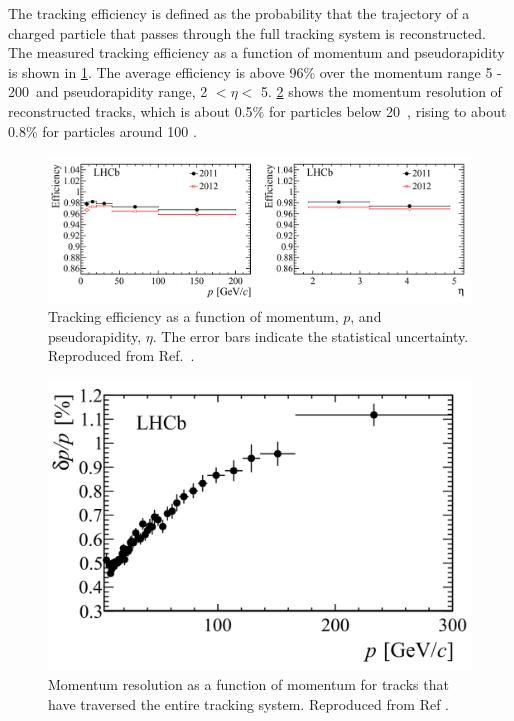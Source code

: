 The tracking efficiency is defined as the probability that the trajectory of a charged particle that passes through the full tracking system is reconstructed. The measured tracking efficiency as a function of momentum and pseudorapidity is shown in \fig\ref{trackingeff}. The average efficiency is above 96\% over the momentum range 5 - 200~\gevc and pseudorapidity range, 2 $< \eta <$ 5. \Fig\ref{momentumres} shows the momentum resolution of reconstructed tracks, which is about 0.5\% for particles below 20~\gevc, rising to about 0.8\% for particles around 100 \gevc. 

\begin{figure}
\includegraphics[width=\linewidth]{figures/detector/trackingefficiency.pdf}
\caption{Tracking efficiency as a function of momentum, $p$, and pseudorapidity, $\eta$. The error bars indicate the statistical uncertainty. Reproduced from Ref.~\cite{LHCb-DP-2013-002}.}
\label{trackingeff}
\end{figure}

\begin{figure}
\centering
\includegraphics[width=0.5\linewidth]{figures/detector/momentumresolution.pdf}
\caption{Momentum resolution as a function of momentum for tracks that have traversed the entire tracking system. Reproduced from Ref \cite{LHCb-DP-2014-002}.}
\label{momentumres}
\end{figure}
	
